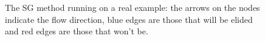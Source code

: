 \documentclass[preprint,a4paper]{elsarticle}
\newenvironment{stusubfig}[1]
{
	\begin{figure}[#1]
	\begin{center}
}
{
	\end{center}
	\end{figure}
}
\begin{document}
\begin{stusubfig}{!t}
\caption[The SG method running on a real example]{The SG method running on a real example: the arrows on the nodes indicate the flow direction, blue edges are those that will be elided and red edges are those that won't be.}
\label{fig:segmentation-waterfall-smg-example}
\end{stusubfig}
\end{document}

